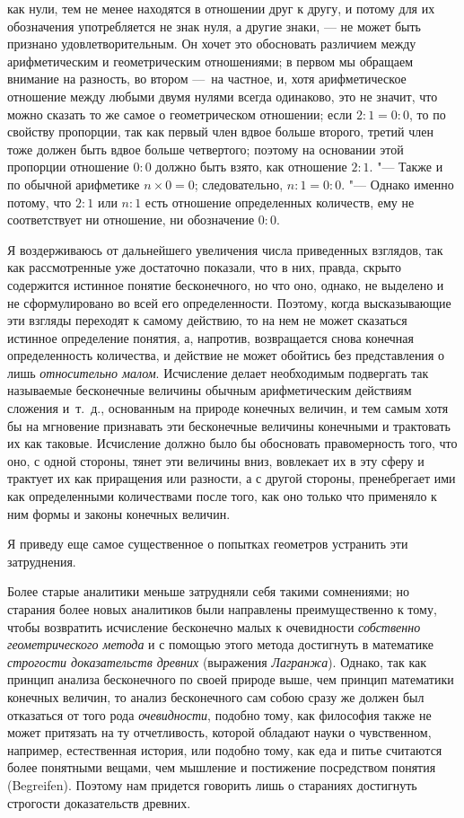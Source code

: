 {как нули, тем не менее находятся в отношении друг к другу, и потому для их
обозначения употребляется не знак нуля, а другие знаки, — не может быть
признано удовлетворительным. Он хочет это обосновать различием между
арифметическим и геометрическим отношениями; в первом мы обращаем внимание
на разность, во втором —~на частное, и, хотя арифметическое отношение между
любыми двумя нулями всегда одинаково, это не значит, что можно сказать то
же самое о геометрическом отношении; если $2 : 1 = 0 : 0$,
то по свойству пропорции, так как первый член вдвое больше второго, третий
член тоже должен быть вдвое больше четвертого; поэтому на основании этой
пропорции отношение $0 : 0$ должно быть взято, как отношение
$2 : 1$. "--- Также и по обычной арифметике $n \times 0 = 0$; следовательно,
$n : 1 = 0 : 0$. "--- Однако именно потому, что $2 : 1$ или $n : 1$
есть отношение определенных количеств, ему не соответствует ни отношение,
ни обозначение $0 : 0$.

Я воздерживаюсь от дальнейшего увеличения числа приведенных взглядов, так
как рассмотренные уже достаточно показали, что в них, правда, скрыто
содержится истинное понятие бесконечного, но что оно, однако, не выделено и
не сформулировано во всей его определенности. Поэтому, когда высказывающие
эти взгляды переходят к самому действию, то на нем не может сказаться
истинное определение понятия, а, напротив, возвращается снова конечная
определенность количества, и действие не может обойтись без представления о
лишь {\em относительно малом}. Исчисление делает
необходимым подвергать так называемые бесконечные величины обычным
арифметическим действиям сложения и~т.~д., основанным на природе конечных
величин, и тем самым хотя бы на мгновение признавать эти бесконечные
величины конечными и трактовать их как таковые. Исчисление должно было бы
обосновать правомерность того, что оно, с одной стороны, тянет эти величины
вниз, вовлекает их в эту сферу и трактует их как приращения или разности, а
с другой стороны, пренебрегает ими как определенными количествами после
того, как оно только что применяло к ним формы и законы конечных величин.

Я приведу еще самое существенное о попытках геометров устранить эти
затруднения.

Более старые аналитики меньше затрудняли себя такими сомнениями; но старания
более новых аналитиков были направлены преимущественно к тому, чтобы
возвратить исчисление бесконечно малых к очевидности
{\em собственно геометрического метода} и с помощью
этого метода достигнуть в математике {\em строгости
доказательств древних} (выражения {\em Лагранжа}).
Однако, так как принцип анализа бесконечного по своей природе выше, чем
принцип математики конечных величин, то анализ бесконечного сам собою сразу
же должен был отказаться от того рода
{\em очевидности}, подобно тому, как философия также не
может притязать на ту отчетливость, которой обладают науки о чувственном,
например, естественная история, или подобно тому, как еда и питье считаются
более понятными вещами, чем мышление и постижение посредством понятия
(Begreifen). Поэтому нам придется говорить лишь о стараниях достигнуть
строгости доказательств древних.

}
